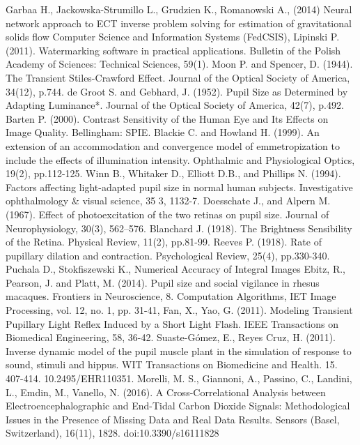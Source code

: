 \documentclass[USenglish,twocolumn]{article}
\begin{document}
\begin{thebibliography}{99}
Garbaa H., Jackowska-Strumillo L., Grudzien  K., Romanowski A., (2014) Neural network approach to ECT inverse problem solving for estimation of gravitational solids flow Computer Science and Information Systems (FedCSIS),
Lipinski P. (2011). Watermarking software in practical applications. Bulletin of the Polish Academy of Sciences: Technical Sciences, 59(1).
Moon P. and Spencer, D. (1944). The Transient Stiles-Crawford Effect. Journal of the Optical Society of America, 34(12), p.744.
de Groot S. and Gebhard, J. (1952). Pupil Size as Determined by Adapting Luminance*. Journal of the Optical Society of America, 42(7), p.492.
Barten P. (2000). Contrast Sensitivity of the Human Eye and Its Effects on Image Quality. Bellingham: SPIE.
Blackie C. and Howland H. (1999). An extension of an accommodation and convergence model of emmetropization to include the effects of illumination intensity. Ophthalmic and Physiological Optics, 19(2), pp.112-125.
Winn B., Whitaker D., Elliott D.B., and Phillips N. (1994). Factors affecting light-adapted pupil size in normal human subjects. Investigative ophthalmology \& visual science, 35 3, 1132-7.
Doesschate J., and Alpern M. (1967). Effect of photoexcitation of the two retinas on pupil size. Journal of Neurophysiology, 30(3), 562–576.
Blanchard J. (1918). The Brightness Sensibility of the Retina. Physical Review, 11(2), pp.81-99.
Reeves P. (1918). Rate of pupillary dilation and contraction. Psychological Review, 25(4), pp.330-340.
Puchala D., Stokfiszewski K., Numerical Accuracy of Integral Images
Ebitz, R., Pearson, J. and Platt, M. (2014). Pupil size and social vigilance in rhesus macaques. Frontiers in Neuroscience, 8.
Computation Algorithms, IET Image Processing, vol. 12, no. 1, pp. 31-41,
Fan, X., Yao, G. (2011). Modeling Transient Pupillary Light Reflex Induced by a Short Light Flash. IEEE Transactions on Biomedical Engineering, 58, 36-42.
Suaste-Gómez, E., Reyes Cruz, H. (2011). Inverse dynamic model of the pupil muscle plant in the simulation of response to sound, stimuli and hippus. WIT Transactions on Biomedicine and Health. 15. 407-414. 10.2495/EHR110351. 
Morelli, M. S., Giannoni, A., Passino, C., Landini, L., Emdin, M., Vanello, N. (2016). A Cross-Correlational Analysis between Electroencephalographic and End-Tidal Carbon Dioxide Signals: Methodological Issues in the Presence of Missing Data and Real Data Results. Sensors (Basel, Switzerland), 16(11), 1828. doi:10.3390/s16111828
\end{thebibliography}
\end{document}
